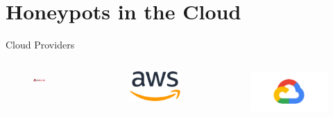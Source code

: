 \section{Honeypots in the Cloud}

\begin{frame}{Cloud Providers}
    \begin{columns}
        \begin{column}{0.25\textwidth}
            \begin{figure}
                \centering
                \includegraphics[width=\columnwidth]{img/heicloud_logo.png}
            \end{figure}
        \end{column}
        \begin{column}{.02\textwidth}
            \rule{.1mm}{0.7\textheight}
        \end{column}
        \begin{column}{0.25\textwidth}
            \begin{figure}
                \centering
                \includegraphics[width=0.5\columnwidth]{img/aws_logo.png}
            \end{figure}
        \end{column}
        \begin{column}{0.25\textwidth}
            \begin{figure}
                \centering
                \includegraphics[width=\columnwidth]{img/gcp_logo.png}

\end{figure}
\end{column}
\end{columns}
\end{frame}
